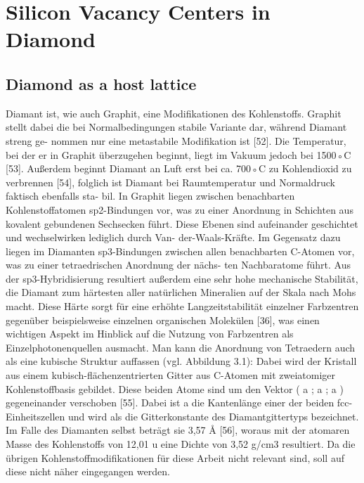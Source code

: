 
\chapter{Silicon Vacancy Centers in Diamond}	\label{ch::sivs}

\section{Diamond as a host lattice}

  Diamant ist, wie auch Graphit, eine Modifikationen des Kohlenstoffs. Graphit stellt dabei die bei Normalbedingungen stabile Variante dar, während Diamant streng ge- nommen nur eine metastabile Modifikation ist [52]. Die Temperatur, bei der er in Graphit überzugehen beginnt, liegt im Vakuum jedoch bei 1500◦C [53]. Außerdem beginnt Diamant an Luft erst bei ca. 700◦C zu Kohlendioxid zu verbrennen [54], folglich ist Diamant bei Raumtemperatur und Normaldruck faktisch ebenfalls sta- bil. In Graphit liegen zwischen benachbarten Kohlenstoffatomen sp2-Bindungen vor, was zu einer Anordnung in Schichten aus kovalent gebundenen Sechsecken führt. Diese Ebenen sind aufeinander geschichtet und wechselwirken lediglich durch Van- der-Waals-Kräfte. Im Gegensatz dazu liegen im Diamanten sp3-Bindungen zwischen allen benachbarten C-Atomen vor, was zu einer tetraedrischen Anordnung der nächs- ten Nachbaratome führt. Aus der sp3-Hybridisierung resultiert außerdem eine sehr hohe mechanische Stabilität, die Diamant zum härtesten aller natürlichen Mineralien auf der Skala nach Mohs macht. Diese Härte sorgt für eine erhöhte Langzeitstabilität einzelner Farbzentren gegenüber beispielsweise einzelnen organischen Molekülen [36], was einen wichtigen Aspekt im Hinblick auf die Nutzung von Farbzentren als Einzelphotonenquellen ausmacht. Man kann die Anordnung von Tetraedern auch als eine kubische Struktur auffassen (vgl. Abbildung 3.1): Dabei wird der Kristall aus einem kubisch-flächenzentrierten Gitter aus C-Atomen mit zweiatomiger Kohlenstoffbasis gebildet. Diese beiden Atome sind um den Vektor ( a ; a ; a ) gegeneinander verschoben [55]. Dabei ist a die Kantenlänge einer der beiden fcc-Einheitszellen und wird als die Gitterkonstante des Diamantgittertyps bezeichnet. Im Falle des Diamanten selbst beträgt sie 3,57 Å [56], woraus mit der atomaren Masse des Kohlenstoffs von 12,01 u eine Dichte von 3,52 g/cm3 resultiert. Da die übrigen Kohlenstoffmodifikationen für diese Arbeit nicht relevant sind, soll auf diese nicht näher eingegangen werden.

